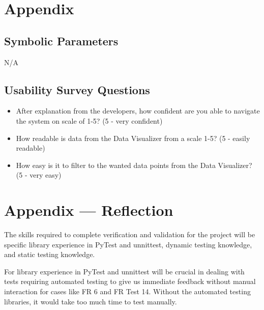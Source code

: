 \documentclass[12pt, titlepage]{article}
\begin{document}


				




\newpage

\section{Appendix}

\subsection{Symbolic Parameters}
N/A

\subsection{Usability Survey Questions}

\begin{itemize}
    \item After explanation from the developers, how confident are you able to navigate the system on scale of 1-5? (5 - very confident)
    \item How readable is data from the Data Visualizer from a scale 1-5? (5 - easily readable)
    \item How easy is it to filter to the wanted data points from the Data Visualizer? (5 - very easy)
\end{itemize}

\newpage{}
\section*{Appendix --- Reflection}

The skills required to complete verification and validation for the project will be specific library experience in PyTest and unnittest, dynamic testing knowledge, and static testing knowledge.

For library experience in PyTest and unnittest will be crucial in dealing with tests requiring automated testing to give us immediate feedback without manual interaction for cases like FR 6 and FR Test 14. Without the automated testing libraries, it would take too much time to test manually. 
\end{document}
